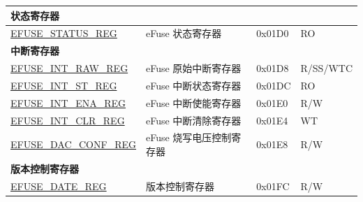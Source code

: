 \begin{longtable}{ | p{5.8cm} | p{7cm} | p{1.3cm} | p{1.2cm} | }
\multicolumn{4}{|l|}{\textbf{状态寄存器}} \\ \hline
\hyperref[regdesc:EFUSESTATUSREG]{EFUSE\_STATUS\_REG} & eFuse 状态寄存器 & 0x01D0 & RO \\ \hline
\multicolumn{4}{|l|}{\textbf{中断寄存器}} \\ \hline
\hyperref[regdesc:EFUSEINTRAWREG]{EFUSE\_INT\_RAW\_REG} & eFuse 原始中断寄存器 & 0x01D8 & R/SS/WTC \\ \hline
\hyperref[regdesc:EFUSEINTSTREG]{EFUSE\_INT\_ST\_REG} & eFuse 中断状态寄存器 & 0x01DC & RO \\ \hline
\hyperref[regdesc:EFUSEINTENAREG]{EFUSE\_INT\_ENA\_REG} & eFuse 中断使能寄存器 & 0x01E0 & R/W \\ \hline
\hyperref[regdesc:EFUSEINTCLRREG]{EFUSE\_INT\_CLR\_REG} & eFuse 中断清除寄存器 & 0x01E4 & WT \\ \hline
\hyperref[regdesc:EFUSEDACCONFREG]{EFUSE\_DAC\_CONF\_REG} &  eFuse 烧写电压控制寄存器 & 0x01E8 & R/W \\ \hline
\multicolumn{4}{|l|}{\textbf{版本控制寄存器}} \\ \hline
\hyperref[regdesc:EFUSEDATEREG]{EFUSE\_DATE\_REG} & 版本控制寄存器 & 0x01FC & R/W \\ \hline
\end{longtable}